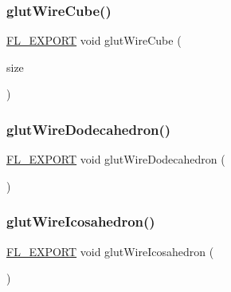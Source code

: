 \mbox{\label{glut_8_h_a252c394216f972c963a7cc0dae41a4ac}} 
\subsubsection{\texorpdfstring{glut\+Wire\+Cube()}{glutWireCube()}}
{\footnotesize\ttfamily \hyperlink{_fl___export_8_h_aa9ba29a18aee9d738370a06eeb4470fc}{F\+L\+\_\+\+E\+X\+P\+O\+RT} void glut\+Wire\+Cube (\begin{DoxyParamCaption}\item[{G\+Ldouble}]{size }\end{DoxyParamCaption})}

\mbox{\label{glut_8_h_a6d232720bfb64a96006aea20c1bf1370}} 
\subsubsection{\texorpdfstring{glut\+Wire\+Dodecahedron()}{glutWireDodecahedron()}}
{\footnotesize\ttfamily \hyperlink{_fl___export_8_h_aa9ba29a18aee9d738370a06eeb4470fc}{F\+L\+\_\+\+E\+X\+P\+O\+RT} void glut\+Wire\+Dodecahedron (\begin{DoxyParamCaption}{ }\end{DoxyParamCaption})}

\mbox{\label{glut_8_h_adfb4aa21cd0ce1a136a86ce8e93633d5}} 
\subsubsection{\texorpdfstring{glut\+Wire\+Icosahedron()}{glutWireIcosahedron()}}
{\footnotesize\ttfamily \hyperlink{_fl___export_8_h_aa9ba29a18aee9d738370a06eeb4470fc}{F\+L\+\_\+\+E\+X\+P\+O\+RT} void glut\+Wire\+Icosahedron (\begin{DoxyParamCaption}{ }\end{DoxyParamCaption})}

\mbox{\label{glut_8_h_a946e58420cfb1889a8294d7ac9c8eecd}} 
